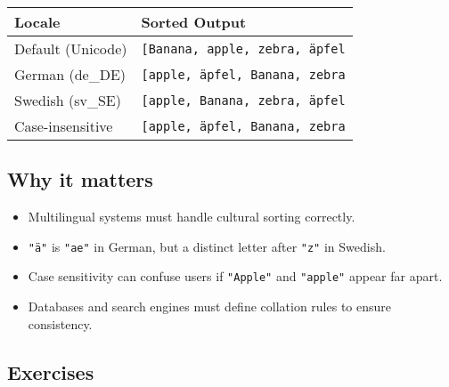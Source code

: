 \documentclass[
  letterpaper,
  DIV=11,
  numbers=noendperiod]{scrreprt}
\providecommand{\tightlist}{%
  \setlength{\itemsep}{0pt}\setlength{\parskip}{0pt}}
\begin{document}
\begin{longtable}[]{@{}ll@{}}
\toprule\noalign{}
Locale & Sorted Output \\
\midrule\noalign{}
\endhead
\bottomrule\noalign{}
\endlastfoot
Default (Unicode) &
\texttt{{[}\textquotesingle{}Banana\textquotesingle{},\ \textquotesingle{}apple\textquotesingle{},\ \textquotesingle{}zebra\textquotesingle{},\ \textquotesingle{}äpfel\textquotesingle{}{]}} \\
German (de\_DE) &
\texttt{{[}\textquotesingle{}apple\textquotesingle{},\ \textquotesingle{}äpfel\textquotesingle{},\ \textquotesingle{}Banana\textquotesingle{},\ \textquotesingle{}zebra\textquotesingle{}{]}} \\
Swedish (sv\_SE) &
\texttt{{[}\textquotesingle{}apple\textquotesingle{},\ \textquotesingle{}Banana\textquotesingle{},\ \textquotesingle{}zebra\textquotesingle{},\ \textquotesingle{}äpfel\textquotesingle{}{]}} \\
Case-insensitive &
\texttt{{[}\textquotesingle{}apple\textquotesingle{},\ \textquotesingle{}äpfel\textquotesingle{},\ \textquotesingle{}Banana\textquotesingle{},\ \textquotesingle{}zebra\textquotesingle{}{]}} \\
\end{longtable}

\subsection{Why it matters}\label{why-it-matters-51}

\begin{itemize}
\tightlist
\item
  Multilingual systems must handle cultural sorting correctly.
\item
  \texttt{"ä"} is \texttt{"ae"} in German, but a distinct letter after
  \texttt{"z"} in Swedish.
\item
  Case sensitivity can confuse users if \texttt{"Apple"} and
  \texttt{"apple"} appear far apart.
\item
  Databases and search engines must define collation rules to ensure
  consistency.
\end{itemize}

\subsection{Exercises}\label{exercises-50}
\end{document}
